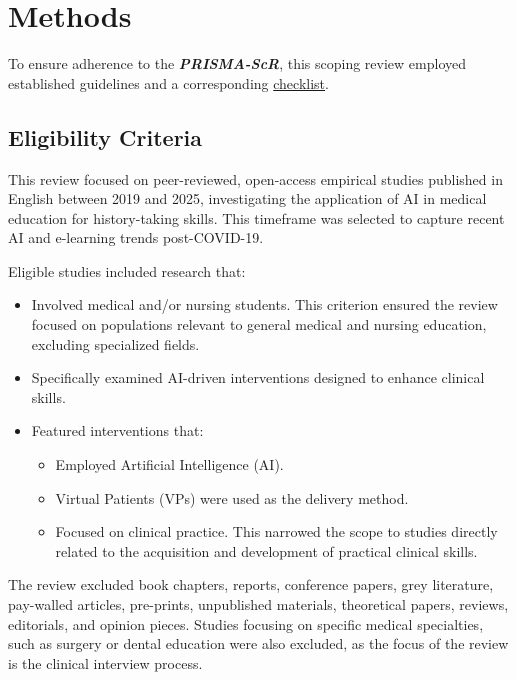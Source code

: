 \section{Methods}

To ensure adherence to the \textit{\textbf{PRISMA-ScR}}, this scoping review employed established guidelines and a corresponding \href{/#}{checklist}.

\subsection{Eligibility Criteria}

This review focused on peer-reviewed, open-access empirical studies published in English between 2019 and 2025, investigating the application of AI in medical education for history-taking skills. This timeframe was selected to capture recent AI and e-learning trends post-COVID-19.

Eligible studies included research that:

\begin{itemize}
    \item   Involved medical and/or nursing students. This criterion ensured the review focused on populations relevant to general medical and nursing education, excluding specialized fields.
    \item   Specifically examined AI-driven interventions designed to enhance clinical skills.
    \item   Featured interventions that:
        \begin{itemize}
            \item   Employed Artificial Intelligence (AI).
            \item    Virtual Patients (VPs) were used as the delivery method.
            \item   Focused on clinical practice. This narrowed the scope to studies directly related to the acquisition and development of practical clinical skills.
        \end{itemize}
\end{itemize}

The review excluded book chapters, reports, conference papers, grey literature, pay-walled articles, pre-prints, unpublished materials, theoretical papers, reviews, editorials, and opinion pieces. Studies focusing on specific medical specialties, such as surgery or dental education were also excluded, as the focus of the review is the clinical interview process.

